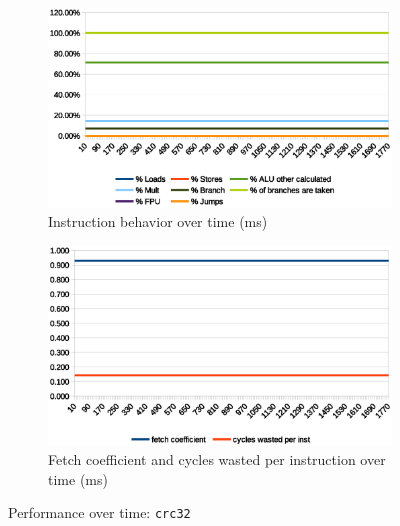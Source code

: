 \documentclass[../bachelor_paper.tex]{subfiles}
\begin{document}
\begin{figure}
    \begin{subfigure}{0.45\textwidth}
        \includegraphics[width=\textwidth]{img/graph/embench/crc32_inst.eps}
        \caption{Instruction behavior over time (ms)}
    \end{subfigure}
    \begin{subfigure}{0.45\textwidth}
        \includegraphics[width=\textwidth]{img/graph/embench/crc32_fetch_waste.eps}
        \caption{Fetch coefficient and cycles wasted per instruction over time (ms)}
    \end{subfigure}
    \caption{Performance over time: \texttt{crc32}}
\end{figure}
\end{document}
